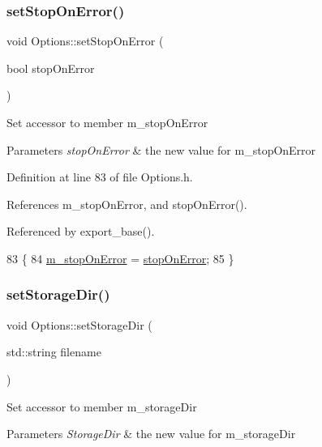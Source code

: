 \subsubsection{\texorpdfstring{set\+Stop\+On\+Error()}{setStopOnError()}}
{\footnotesize\ttfamily void Options\+::set\+Stop\+On\+Error (\begin{DoxyParamCaption}\item[{bool}]{stop\+On\+Error }\end{DoxyParamCaption})\hspace{0.3cm}{\ttfamily [inline]}}

Set accessor to member m\+\_\+stop\+On\+Error 
\begin{DoxyParams}{Parameters}
{\em stop\+On\+Error} & the new value for m\+\_\+stop\+On\+Error \\
\hline
\end{DoxyParams}


Definition at line 83 of file Options.\+h.



References m\+\_\+stop\+On\+Error, and stop\+On\+Error().



Referenced by export\+\_\+base().


\begin{DoxyCode}
83                                                \{
84                 \hyperlink{classOptions_a879c2741a290595adb3f74633f3a3987}{m\_stopOnError} = \hyperlink{classOptions_afcd7b27fdf474050d912571e09525efe}{stopOnError};
85         \}
\end{DoxyCode}
\mbox{\label{classOptions_aed5e6919526bcfa5cf4961230bd20e37}} 
\subsubsection{\texorpdfstring{set\+Storage\+Dir()}{setStorageDir()}}
{\footnotesize\ttfamily void Options\+::set\+Storage\+Dir (\begin{DoxyParamCaption}\item[{std\+::string}]{filename }\end{DoxyParamCaption})\hspace{0.3cm}{\ttfamily [inline]}}

Set accessor to member m\+\_\+storage\+Dir 
\begin{DoxyParams}{Parameters}
{\em Storage\+Dir} & the new value for m\+\_\+storage\+Dir \\
\hline
\end{DoxyParams}


